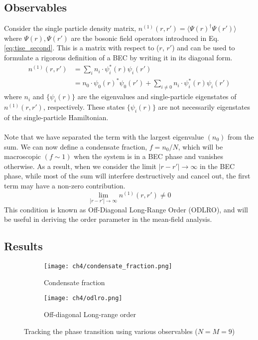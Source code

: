\subsection{Observables}
Consider the single particle density matrix, $n^{(1)}(r, r') = \langle \Psi(r)^{\dagger} \Psi(r') \rangle$ where $\Psi(r), \Psi(r')$ are the bosonic field operators introduced in Eq. \eqref{eq:tise_second}. This is a matrix with respect to ($r$, $r'$) and can be used to formulate a rigorous definition of a BEC by writing it in its diagonal form.
\begin{align}
    n^{(1)}(r, r') &= \sum_i n_i \cdot \psi_i^*(r)\psi_i(r') \nonumber \\
    &= n_0 \cdot \psi_0(r)^*\psi_0(r') + \sum_{i\neq 0}  n_i \cdot \psi_i^*(r)\psi_i(r')
\end{align}
where $n_i$ and $\{\psi_i(r)\}$ are the eigenvalues and single-particle eigenstates of $n^{(1)}(r, r')$, respectively. These states $\{\psi_i(r)\}$ are not necessarily eigenstates of the single-particle Hamiltonian.
\\
\\
Note that we have separated the term with the largest eigenvalue $(n_0)$ from the sum. We can now define a condensate fraction, $f = n_0/N$, which will be macroscopic $(f \sim 1)$ when the system is in a BEC phase and vanishes otherwise. As a result, when we consider the limit $|r - r'| \to \infty$ in the BEC phase, while most of the sum will interfere destructively and cancel out, the first term may have a non-zero contribution\cite{leggett2008}.
\begin{equation}\label{eq:odlro}
    \lim_{|r-r'|\to \infty}  n^{(1)}(r, r') \neq 0
\end{equation}
This condition is known as Off-Diagonal Long-Range Order (ODLRO), and will be useful in deriving the order parameter in the mean-field analysis.

\subsection{Results}
\begin{figure}[!htb]
    \centering
    \begin{subfigure}[b]{0.45\textwidth}  %
        \centering
        \texttt{[image: ch4/condensate\_fraction.png]}
        \caption{Condensate fraction}
        \label{fig:cond_frac}
    \end{subfigure}
    \hspace{1em}  %
    \begin{subfigure}[b]{0.45\textwidth}
        \centering
        \texttt{[image: ch4/odlro.png]}
        \caption{Off-diagonal Long-range order}
        \label{fig:odlro}
    \end{subfigure}
    \caption{Tracking the phase transition using various observables ($N = M = 9$)}
    \label{fig:ed_track}
\end{figure}
\FloatBarrier \!\!\!\!\!\!\!\!\!\!\!

